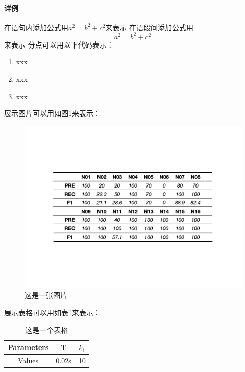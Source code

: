 \documentclass[12pt]{article}
\begin{document}
\paragraph{\songti{}详例}
\clearpage
\songti{}在语句内添加公式用$a^2=b^2+c^2$来表示
\songti{}在语段间添加公式用$$a^2=b^2+c^2$$来表示
\clearpage
\songti{}分点可以用以下代码表示：
\begin{enumerate}
    \songti{}\item xxx
    \songti{}\item xxx
    \songti{}\item xxx
\end{enumerate}
\clearpage
\songti{}展示图片可以用如图1来表示：
\begin{figure}[H]
    \label{fig:图片}
    \centering
    \includegraphics[scale=0.5,trim=150 220 150 220,clip]{图片.jpeg}
    \caption{\fangsong 这是一张图片}
\end{figure}
\clearpage
\songti{}展示表格可以用如表1来表示：
\begin{table}[H]
    \centering
    \begin{tabular}{ccc}
        \hline
        Parameters & T & $k_1$ \\ 
        \hline
        Values & 0.02s & 10 \\ 
        \hline
    \end{tabular}
    \caption{\fangsong 这是一个表格}
\end{table}
\end{document}
